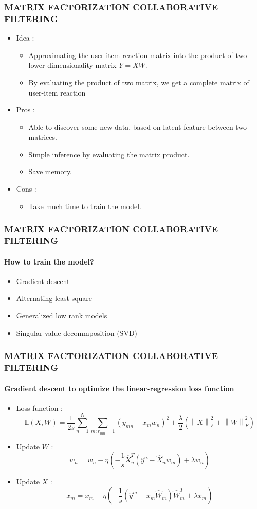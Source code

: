 \documentclass[11pt]{beamer}
\begin{document}
\begin{frame}
\frametitle{\textbf{MATRIX FACTORIZATION COLLABORATIVE FILTERING}}
\begin{itemize}

	\pause\item Idea : 
	\begin{itemize}
		\item Approximating the user-item reaction matrix into the product of two lower dimensionality matrix $Y = XW$.
		\item By evaluating the product of two matrix, we get a complete matrix of user-item reaction 
	\end{itemize}
	\pause\item Pros :
	\begin{itemize}
		\item Able to discover some new data, based on latent feature between two matrices.
		\item Simple inference by evaluating the matrix product.
		\item Save memory.
	\end{itemize}
	\pause\item Cons : 
	\begin{itemize}
		\item Take much time to train the model.
	\end{itemize}
\end{itemize}
\end{frame}


\begin{frame}
\frametitle{\textbf{MATRIX FACTORIZATION COLLABORATIVE FILTERING}}
\framesubtitle{\textbf{How to train the model?}}
\begin{itemize}
	\pause\item Gradient descent
	\pause\item Alternating least square
	\pause\item Generalized low rank models
	\pause\item Singular value decommposition (SVD)
\end{itemize}	
\end{frame}

\begin{frame}
\frametitle{\textbf{MATRIX FACTORIZATION COLLABORATIVE FILTERING}}
\framesubtitle{\textbf{Gradient descent to optimize the linear-regression loss function}}
\begin{itemize}
	\pause\item Loss function :
	$$ \mathbb{L}(X,W) = \dfrac{1}{2s}\sum_{n=1}^{N}\sum_{m:r_{mn}=1}(y_{mn}-x_mw_n)^2+\dfrac{\lambda}{2}\left(\left\|X\right\|^2_F+\left\|W\right\|^2_F\right) $$
	\pause\item Update $W$ : 
	$$w_n = w_n - \eta\left(-\dfrac{1}{s}\hat{X}^T_n(\hat{y}^n-\hat{X}_nw_m)+ \lambda w_n\right) $$
	\pause\item Update $X$ : 
	$$x_m = x_m - \eta\left(-\dfrac{1}{s}(\hat{y}^m-x_m\hat{W}_m)\hat{W}^T_m + \lambda x_m\right) $$
\end{itemize}
\end{frame}
\end{document}
